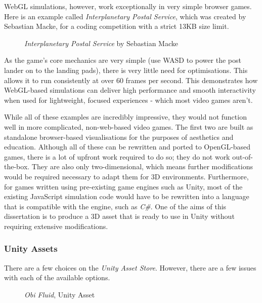 \documentclass[12pt]{article}
\newcommand{\wideimage}[2][]{%
  \makebox[\textwidth][c]{\texttt{[image: \#2]}}%
}
\begin{document}
    WebGL simulations, however, work exceptionally in very simple browser games. Here is an example called \textit{Interplanetary Postal Service}\cite{ips}, which was created by Sebastian Macke, for a coding competition with a strict 13KB size limit.

    \begin{figure}[H]
        \noindent\wideimage[]{webGLIPS.png}
        \caption{\textit{Interplanetary Postal Service} by Sebastian Macke \cite{ips}}
    \end{figure}

    As the game's core mechanics are very simple (use WASD to power the post lander on to the landing pads), there is very little need for optimisations. This allows it to run consistently at over 60 frames per second. This demonstrates how WebGL-based simulations can deliver high performance and smooth interactivity when used for lightweight, focused experiences - which most video games aren't.

    While all of these examples are incredibly impressive, they would not function well in more complicated, non-web-based video games. The first two are built as standalone browser-based visualisations for the purposes of aesthetics and education. Although all of these can be rewritten and ported to OpenGL-based games, there is a lot of upfront work required to do so; they do not work out-of-the-box. They are also only two-dimensional, which means further modifications would be required necessary to adapt them for 3D environments. Furthermore, for games written using pre-existing game engines such as Unity, most of the existing JavaScript simulation code would have to be rewritten into a language that is compatible with the engine, such as \textit{C\#}. One of the aims of this dissertation is to produce a 3D asset that is ready to use in Unity without requiring extensive modifications.

    \subsubsection{Unity Assets}

    There are a few choices on the \textit{Unity Asset Store}\cite{unityasset}. However, there are a few issues with each of the available options.

    \begin{figure}[H]
        \noindent\wideimage[]{obiFluid.png}
        \caption{\textit{Obi Fluid}, Unity Asset \cite{obi}}
    \end{figure}
\end{document}
